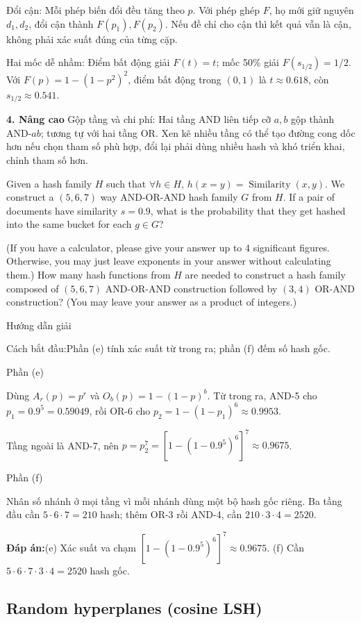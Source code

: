\documentclass[10pt,a4paper,twocolumn]{article}
\makeatletter
\newcommand{\maptag}[1]{\phantomsection\@bsphack\protected@write\@auxout{}{\string\newlabel{#1}{{}{\thepage}{}{\@currentHref}{}}}\@esphack}
\newif\ifexamheadingprinted
\newcommand{\topic}[2]{%
  \global\examheadingprintedfalse\par\subsection{#2}\label{topic:#1}}
\newcommand{\key}[1]{#1:\enspace}
\newcommand{\solutionprompt}[1]{\par\addvspace{1pt}\noindent\key{Cách bắt đầu}#1\par\addvspace{2pt}}
\newcommand{\blocklabel}[1]{\par\noindent#1\par\nobreak}
\newcommand{\answer}[1]{%
  \par\addvspace{3pt}%
  \blocklabel{#1Hướng dẫn giải}}
\newcommand{\finalanswer}[1]{%
  \par\addvspace{3pt}\noindent\textbf{Đáp án:}\nobreak\enspace#1\par}
\newcommand{\guidepart}[1]{%
  \par\addvspace{1.5pt}%
  \blocklabel{Phần #1}}
\newcommand{\unitheading}[2]{%
  \par\addvspace{1pt}\noindent\textbf{#1. #2}\enspace}
\newcommand{\unitadvanced}{\unitheading{4}{Nâng cao}}
\makeatother
\begin{document}
\key{Đổi cận} Mỗi phép biến đổi đều tăng theo $p$. Với phép ghép $F$, họ mới giữ nguyên $d_1,d_2$, đổi cận thành $F(p_1),F(p_2)$. Nếu đề chỉ cho cận thì kết quả vẫn là cận, không phải xác suất đúng của từng cặp.

\key{Hai mốc dễ nhầm} Điểm bất động giải $F(t)=t$; mốc 50\% giải $F(s_{1/2})=1/2$. Với $F(p)=1-(1-p^2)^2$, điểm bất động trong $(0,1)$ là $t\approx0.618$, còn $s_{1/2}\approx0.541$.

\unitadvanced
\key{Gộp tầng và chi phí} Hai tầng AND liên tiếp cỡ $a,b$ gộp thành AND-$ab$; tương tự với hai tầng OR. Xen kẽ nhiều tầng có thể tạo đường cong dốc hơn nếu chọn tham số phù hợp, đổi lại phải dùng nhiều hash và khó triển khai, chỉnh tham số hơn.

 Given a hash family $H$ such that $\forall h\in H$, $h(x=y)=\operatorname{Similarity}(x,y)$. We construct a $(5,6,7)$ way AND-OR-AND hash family $G$ from $H$. If a pair of documents have similarity $s=0.9$, what is the probability that they get hashed into the same bucket for each $g\in G$?

(If you have a calculator, please give your answer up to 4 significant figures. Otherwise, you may just leave exponents in your answer without calculating them.)
 How many hash functions from $H$ are needed to construct a hash family composed of $(5,6,7)$ AND-OR-AND construction followed by $(3,4)$ OR-AND construction? (You may leave your answer as a product of integers.)

\answer{\maptag{answer:P24-Q2ef}\maptag{answer:A1-Q2ef}}
\solutionprompt{Phần (e) tính xác suất từ trong ra; phần (f) đếm số hash gốc.}
\guidepart{(e)}
\begin{guidesteps}
\item Dùng $A_r(p)=p^r$ và $O_b(p)=1-(1-p)^b$. Từ trong ra, AND-5 cho $p_1=0.9^5=0.59049$, rồi OR-6 cho $p_2=1-(1-p_1)^6\approx0.9953$.
\item Tầng ngoài là AND-7, nên $p=p_2^7=[1-(1-0.9^5)^6]^7\approx0.9675$.
\end{guidesteps}
\guidepart{(f)}
\begin{guidesteps}
\item Nhân số nhánh ở mọi tầng vì mỗi nhánh dùng một bộ hash gốc riêng. Ba tầng đầu cần $5\cdot6\cdot7=210$ hash; thêm OR-3 rồi AND-4, cần $210\cdot3\cdot4=2520$.
\end{guidesteps}
\finalanswer{(e) Xác suất va chạm $[1-(1-0.9^5)^6]^7\approx0.9675$. (f) Cần $5\cdot6\cdot7\cdot3\cdot4=2520$ hash gốc.}
\topic{hyperplanes}{Random hyperplanes (cosine LSH)}
\end{document}
